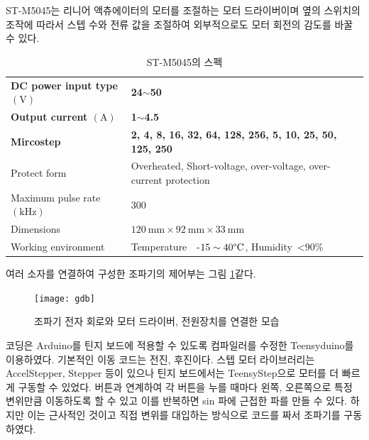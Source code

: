 ST-M5045는 리니어 액츄에이터의 모터를 조절하는 모터 드라이버이며 옆의 스위치의 조작에 따라서 스텝 수와 전류 값을 조절하여 외부적으로도 모터 회전의 감도를 바꿀 수 있다.

\begin{table}[H]
    \centering
    \captionsetup{justification=centering}
    \caption{ST-M5045의 스펙}
    \begin{tabular}{ll}
        \hline
        \textbf{DC power input type $(\mathrm{V})$}  & \textbf{24$\sim$50}      \\
        \textbf{Output current $(\mathrm{A})$}       & \textbf{1$\sim$4.5}      \\
        \textbf{Mircostep}           & \textbf{2, 4, 8, 16, 32, 64, 128, 256, 5, 10, 25, 50, 125, 250               }                \\
        Protect form        & Overheated, Short-voltage, over-voltage, over-current protection \\
        Maximum pulse rate $(\mathrm{kHz})$ & 300             \\
        Dimensions               & $120\mathrm{~mm} \times92\mathrm{~mm}\times33\mathrm{~mm}$ \\
        Working environment & Temperature~~-$15\sim40\mathrm{\degree C}$, Humidity~\textless{}$90\%$ \\ 
        \hline
    \end{tabular}
    \label{Specification of ST-M5045}
\end{table}

여러 소자를 연결하여 구성한 조파기의 제어부는 그림 \ref{Wavemaker}\와 같다.

\begin{figure}[H]
	\begin{center}
		\texttt{[image: gdb]}
		\caption{조파기 전자 회로와 모터 드라이버, 전원장치를 연결한 모습}
		\label{Wavemaker}
	\end{center}
\end{figure}


코딩은 Arduino를 틴지 보드에 적용할 수 있도록 컴파일러를 수정한 Teensyduino를 이용하였다. 기본적인 이동 코드는 전진, 후진이다. 스텝 모터 라이브러리는 AccelStepper, Stepper 등이 있으나 틴지 보드에서는 TeensyStep으로 모터를 더 빠르게 구동할 수 있었다. 버튼과 연계하여 각 버튼을 누를 때마다 왼쪽, 오른쪽으로 특정 변위만큼 이동하도록 할 수 있고 이를 반복하면 sin 파에 근접한 파를 만들 수 있다. 하지만 이는 근사적인 것이고 직접 변위를 대입하는 방식으로 코드를 짜서 조파기를 구동하였다.

